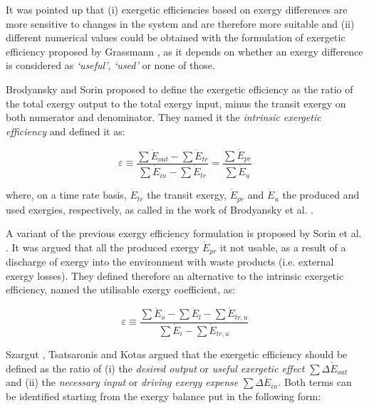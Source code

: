 \documentclass[times,3p]{elsarticle}
\begin{document}
It was pointed up that (i) exergetic efficiencies based on exergy differences are more sensitive to changes in the system and are therefore more suitable and (ii) different numerical values could be obtained with the formulation of exergetic efficiency proposed by Grassmann \cite{Grassmann1950}, as it depends on whether an exergy difference is considered as \emph{`useful'}, \emph{`used'} or none of those.


Brodyansky \cite{Brodyansky1994} and Sorin \cite{Sorin1994} proposed to define the exergetic efficiency as the ratio of the total exergy output to the total exergy input, minus the transit exergy on both numerator and denominator. They named it the \emph{intrinsic exergetic efficiency} and defined it as:

\begin{equation}
\varepsilon \equiv \frac{\sum \dot{E}_{out}-\sum \dot{E}_{tr}}{\sum \dot{E}_{in}-\sum \dot{E}_{tr}} = \frac{\sum \dot{E}_{pr}}{\sum \dot{E}_u}
\end{equation}

	where, on a time rate basis, $\dot{E}_{tr}$ the transit exergy, $\dot{E}_{pr}$ and $\dot{E}_{u}$ the produced and used exergies, respectively, as called in the work of Brodyansky et al. \cite{Brodyansky1994}.  

A variant of the previous exergy efficiency formulation is proposed by Sorin et al. \cite{Sorin1998}. It was argued that all the produced exergy $\dot{E}_{pr}$ it not usable, as a result of a discharge of exergy into the environment with waste products (i.e. external exergy losses). They defined therefore an alternative to the intrinsic exergetic efficiency, named the utilisable exergy coefficient, as:

\begin{equation}
\varepsilon \equiv \frac{\sum \dot{E}_{o}-\sum \dot{E}_{l}-\sum \dot{E}_{tr,u}}{\sum \dot{E}_{i}-\sum \dot{E}_{tr,u}}
\end{equation}

 Szargut \cite{Szargut1980,Szargut1988,Szargut1998}, Tsatsaronis \cite{Tsatsaronis1985} and Kotas \cite{Kotas1980a,Kotas1995} argued that the exergetic efficiency should be defined as the ratio of (i) the \emph{desired output} or \emph{useful exergetic effect} $\sum \Delta \dot{E}_{out}$ and (ii) the \emph{necessary input} or \emph{driving exergy expense} $\sum \Delta \dot{E}_{in}$. Both terms can be identified starting from the exergy balance put in the following form:
\end{document}
